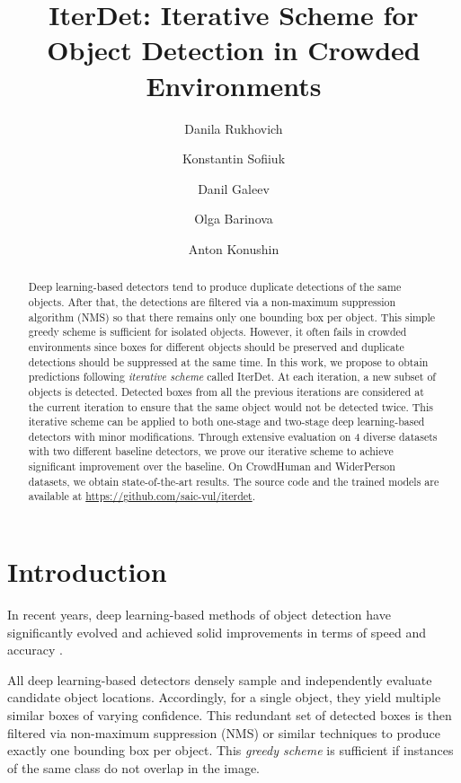 \documentclass[runningheads]{llncs}
\newcommand{\etal}{\emph{et al.}\ }
\begin{document}
\title{IterDet: Iterative Scheme for Object Detection in Crowded Environments}

\author{
    Danila Rukhovich \and
    Konstantin Sofiiuk \and
    Danil Galeev \and
    Olga Barinova \and
    Anton Konushin
}
\authorrunning{D. Rukhovich \etal}

\maketitle

\begin{abstract}
Deep learning-based detectors tend to produce duplicate detections of the same objects. After that, the detections are filtered via a non-maximum suppression algorithm (NMS) so that there remains only one bounding box per object. This simple greedy scheme is sufficient for isolated objects. However, it often fails in crowded environments since boxes for different objects should be preserved and duplicate detections should be suppressed at the same time. In this work, we propose to obtain predictions following \emph{iterative scheme} called IterDet. At each iteration, a new subset of objects is detected. Detected boxes from all the previous iterations are considered at the current iteration to ensure that the same object would not be detected twice. This iterative scheme can be applied to both one-stage and two-stage deep learning-based detectors with minor modifications. Through extensive evaluation on 4 diverse datasets with two different baseline detectors, we prove our iterative scheme to achieve significant improvement over the baseline. On CrowdHuman and WiderPerson datasets, we obtain state-of-the-art results. The source code and the trained models are available at \url{https://github.com/saic-vul/iterdet}.
\end{abstract}

\section{Introduction}
\label{sec:intro}
In recent years, deep learning-based methods of object detection have significantly evolved and achieved solid improvements in terms of speed and accuracy \cite{liu2016ssd,girshick2015fast,ren2015faster,lin2017focal,tian2019fcos}.

All deep learning-based detectors densely sample and independently evaluate candidate object locations. Accordingly, for a single object, they yield multiple similar boxes of varying confidence. This redundant set of detected boxes is then filtered via non-maximum suppression (NMS) or similar techniques to produce exactly one bounding box per object. This \emph{greedy scheme} is sufficient if instances of the same class do not overlap in the image. 
\end{document}
